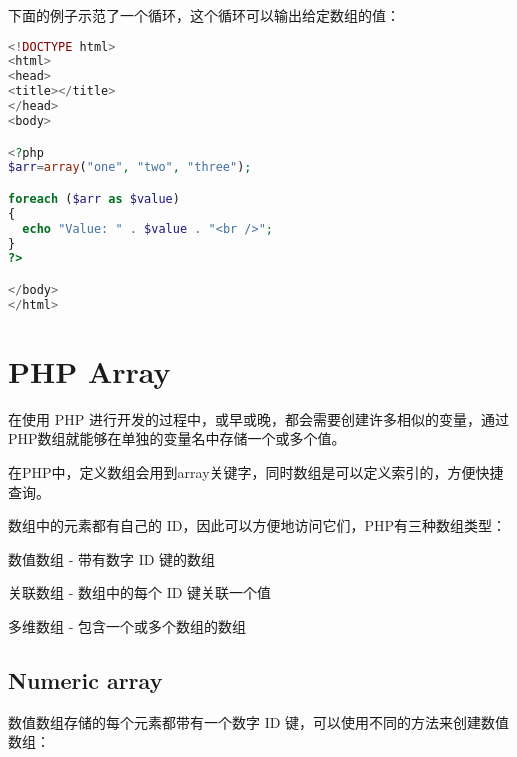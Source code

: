 下面的例子示范了一个循环，这个循环可以输出给定数组的值：

\begin{lstlisting}[language=PHP]
<!DOCTYPE html>
<html>
<head>
<title></title>
</head>
<body>

<?php
$arr=array("one", "two", "three");

foreach ($arr as $value)
{
  echo "Value: " . $value . "<br />";
}
?>

</body>
</html>
\end{lstlisting}





\chapter{PHP Array}



在使用 PHP 进行开发的过程中，或早或晚，都会需要创建许多相似的变量，通过PHP数组就能够在单独的变量名中存储一个或多个值。

在PHP中，定义数组会用到array关键字，同时数组是可以定义索引的，方便快捷查询。

数组中的元素都有自己的 ID，因此可以方便地访问它们，PHP有三种数组类型：

\begin{compactitem}
\item 数值数组 - 带有数字 ID 键的数组

\item 关联数组 - 数组中的每个 ID 键关联一个值

\item 多维数组 - 包含一个或多个数组的数组
\end{compactitem}






\section{Numeric array}

数值数组存储的每个元素都带有一个数字 ID 键，可以使用不同的方法来创建数值数组：

